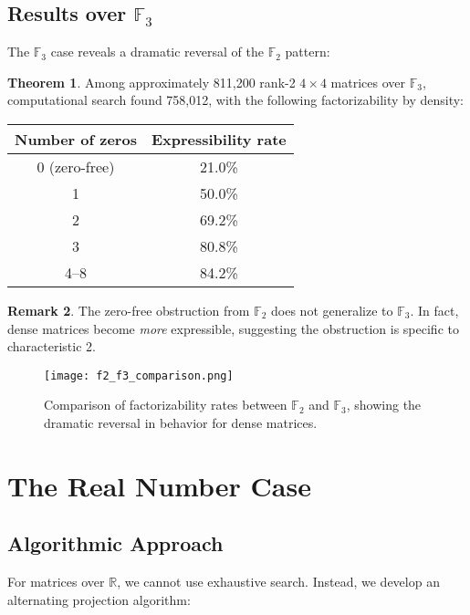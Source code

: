 \documentclass{article}
\theoremstyle{definition}
\newtheorem{theorem}{Theorem}
\newtheorem{remark}[theorem]{Remark}
\begin{document}
\subsection{Results over $\mathbb{F}_3$}

The $\mathbb{F}_3$ case reveals a dramatic reversal of the $\mathbb{F}_2$ pattern:

\begin{theorem}
Among approximately 811,200 rank-2 $4 \times 4$ matrices over $\mathbb{F}_3$, computational search found 758,012, with the following factorizability by density:

\begin{center}
\begin{tabular}{cc}
\toprule
Number of zeros & Expressibility rate \\
\midrule
0 (zero-free) & 21.0\% \\
1 & 50.0\% \\
2 & 69.2\% \\
3 & 80.8\% \\
4--8 & 84.2\% \\
\bottomrule
\end{tabular}
\end{center}
\end{theorem}

\begin{remark}
The zero-free obstruction from $\mathbb{F}_2$ does not generalize to $\mathbb{F}_3$. In fact, dense matrices become \emph{more} expressible, suggesting the obstruction is specific to characteristic 2.
\end{remark}

\begin{figure}[h]
\centering
\texttt{[image: f2\_f3\_comparison.png]}
\caption{Comparison of factorizability rates between $\mathbb{F}_2$ and $\mathbb{F}_3$, showing the dramatic reversal in behavior for dense matrices.}
\label{fig:f2f3}
\end{figure}

\section{The Real Number Case}

\subsection{Algorithmic Approach}

For matrices over $\mathbb{R}$, we cannot use exhaustive search. Instead, we develop an alternating projection algorithm:
\end{document}
